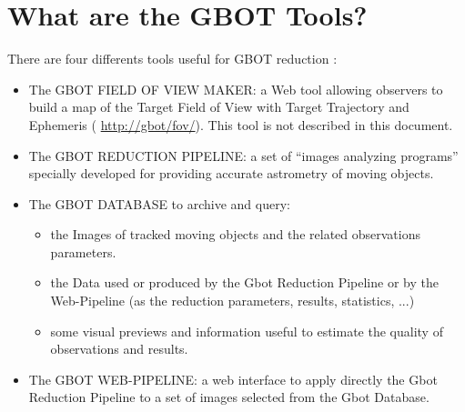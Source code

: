 \documentclass[11pt,twoside]{article}
\begin{document}
\section{What are the GBOT Tools?}
There are four differents tools useful for GBOT reduction : 
\begin{itemize}
\item The GBOT FIELD OF VIEW MAKER: a Web tool allowing observers to build a map of the Target Field of View with Target Trajectory and Ephemeris ( \url{http://gbot/fov/}). This tool is not described in this document.
\item The GBOT REDUCTION PIPELINE: a set of “images analyzing programs” specially developed for providing accurate astrometry of moving objects. 
\item The GBOT DATABASE to archive and query:
                \begin{itemize}
                \item the Images of tracked moving objects and the related observations parameters. 
                \item the Data used or produced by the Gbot Reduction Pipeline or by the Web-Pipeline (as the reduction parameters, results, statistics, ...)
                \item some visual previews and information useful to estimate the quality of observations and results.
                \end{itemize}  
\item The GBOT WEB-PIPELINE: a web interface to apply directly the Gbot Reduction Pipeline to a set of images selected from the Gbot Database.                                    
\end{itemize}
\end{document}
